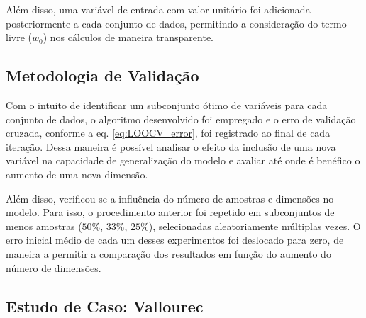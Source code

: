 Além disso, uma variável de entrada com valor unitário foi adicionada posteriormente a cada conjunto de dados, 
permitindo a consideração do termo livre ($w_0$) nos cálculos de maneira transparente.

\subsection{Metodologia de Validação}

Com o intuito de identificar um subconjunto ótimo de variáveis para cada conjunto de dados, o algoritmo 
desenvolvido foi empregado e o erro de validação cruzada, conforme a eq. \ref{eq:LOOCV_error}, foi registrado 
ao final de cada iteração. Dessa maneira é possível analisar o efeito da inclusão de uma nova variável na 
capacidade de generalização do modelo e avaliar até onde é benéfico o aumento de uma nova dimensão.

Além disso, verificou-se a influência do número de amostras e dimensões no modelo. Para isso, o procedimento 
anterior foi repetido em subconjuntos de menos amostras ($50\%$, $33\%$, $25\%$), selecionadas aleatoriamente 
múltiplas vezes. O erro inicial médio de cada um desses experimentos foi deslocado para zero, de maneira a 
permitir a comparação dos resultados em função do aumento do número de dimensões.

\subsection{Estudo de Caso: Vallourec}

